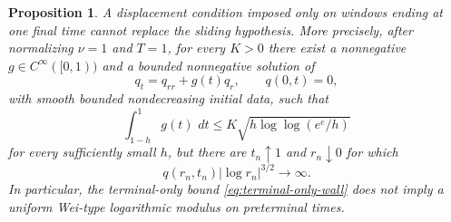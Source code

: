 \documentclass[10pt,a4paper]{amsart}
\newtheorem{proposition}{Proposition}
\newcommand{\dd}{\,d}
\begin{document}
\begin{proposition}\label{prop:terminal-no-go}
A displacement condition imposed only on windows ending at one final time cannot replace the sliding hypothesis.  More precisely, after normalizing $\nu=1$ and $T=1$, for every $K>0$ there exist a nonnegative $g\in C^\infty([0,1))$ and a bounded nonnegative solution of
\[
 q_t=q_{rr}+g(t)q_r,\qquad q(0,t)=0,
\]
with smooth bounded nondecreasing initial data, such that
\begin{equation}\label{eq:terminal-only-wall}
 \int_{1-h}^{1}g(t)\,\dd t
 \le K\sqrt{h\log\log(e^e/h)}
\end{equation}
for every sufficiently small $h$, but there are $t_n\uparrow1$ and $r_n\downarrow0$ for which
\begin{equation}\label{eq:terminal-no-modulus}
 q(r_n,t_n)|\log r_n|^{3/2}\longrightarrow\infty.
\end{equation}
In particular, the terminal-only bound \eqref{eq:terminal-only-wall} does not imply a uniform Wei-type logarithmic modulus on preterminal times.
\end{proposition}
\end{document}
